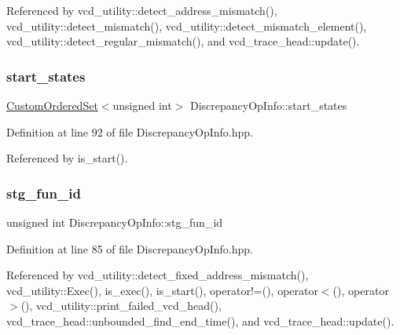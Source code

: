 Referenced by vcd\+\_\+utility\+::detect\+\_\+address\+\_\+mismatch(), vcd\+\_\+utility\+::detect\+\_\+mismatch(), vcd\+\_\+utility\+::detect\+\_\+mismatch\+\_\+element(), vcd\+\_\+utility\+::detect\+\_\+regular\+\_\+mismatch(), and vcd\+\_\+trace\+\_\+head\+::update().

\mbox{\label{classDiscrepancyOpInfo_a9ba4229673f184344f19cf37db450e99}} 
\subsubsection{\texorpdfstring{start\+\_\+states}{start\_states}}
{\footnotesize\ttfamily \hyperlink{classCustomOrderedSet}{Custom\+Ordered\+Set}$<$unsigned int$>$ Discrepancy\+Op\+Info\+::start\+\_\+states}



Definition at line 92 of file Discrepancy\+Op\+Info.\+hpp.



Referenced by is\+\_\+start().

\mbox{\label{classDiscrepancyOpInfo_ab7fe9cfd3d581143f337ddea82422bc4}} 
\subsubsection{\texorpdfstring{stg\+\_\+fun\+\_\+id}{stg\_fun\_id}}
{\footnotesize\ttfamily unsigned int Discrepancy\+Op\+Info\+::stg\+\_\+fun\+\_\+id}



Definition at line 85 of file Discrepancy\+Op\+Info.\+hpp.



Referenced by vcd\+\_\+utility\+::detect\+\_\+fixed\+\_\+address\+\_\+mismatch(), vcd\+\_\+utility\+::\+Exec(), is\+\_\+exec(), is\+\_\+start(), operator!=(), operator$<$(), operator$>$(), vcd\+\_\+utility\+::print\+\_\+failed\+\_\+vcd\+\_\+head(), vcd\+\_\+trace\+\_\+head\+::unbounded\+\_\+find\+\_\+end\+\_\+time(), and vcd\+\_\+trace\+\_\+head\+::update().

\mbox{\label{classDiscrepancyOpInfo_a61eee913fc7187aa7f30f7a79dcc3ff7}} 
